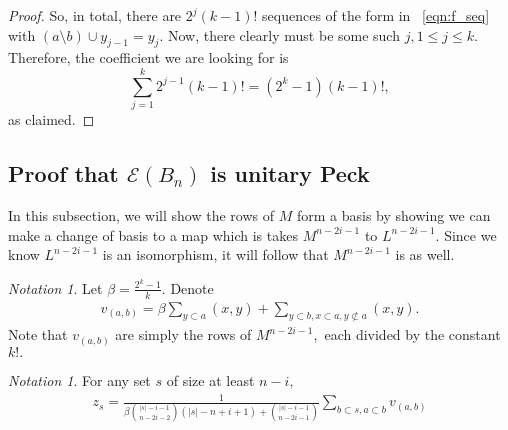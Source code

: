 \documentclass[10 pt]{amsart}
\theoremstyle{plain}
\theoremstyle{definition}
\theoremstyle{remark}
\newtheorem{note}[thm]{Notation}
\numberwithin{equation}{section}
\newcommand\ssec{\subsection}
\begin{document}
\begin{proof}
So, in total, there are $2^j(k-1)!$ sequences of the form in ~\eqref{eqn:f_seq} with $(a\setminus b) \cup y_{j-1} = y_j$. Now, there clearly must be some such $j,1 \leq j \leq k.$ Therefore, the coefficient we are looking for is 
$$\sum_{j = 1}^k 2^{j-1}(k-1)! = (2^k - 1)(k-1)!,$$
as claimed.

\end{proof}



\ssec{Proof that $\mathcal E(B_n)$ is unitary Peck}

In this subsection, we will show the rows of $M$ form a basis by showing we can make a change of basis to a map which is takes $M^{n-2i-1}$ to $L^{n-2i-1}.$ Since we know $L^{n-2i-1}$ is an isomorphism, it will follow that $M^{n-2i-1}$ is as well.

\begin{note}

Let $\beta = \frac{2^k-1}{k}.$ Denote 
\begin{align*}
  v_{(a, b)} =\beta \sum_{y \subset a}^{}(x, y) + \sum_{y\subset b,x \subset a,y\not\subset a}^{}(x, y).
\end{align*}
Note that $v_{(a, b)}$ are simply the rows of $M^{n-2i-1},$ each divided by the constant $k!.$
\end{note}

\begin{note}
For any set $s$ of size at least $n-i,$
\begin{align*}
  z_s = \frac{1}{\beta\binom {|s|-i-1}{n-2i-2}(|s|-n+i+1)+\binom{|s|-i-1}{n-2i-1}} \sum_{b\subset s,a \subset b}^{}v_{(a, b)}
\end{align*}
\end{note}
\end{document}
